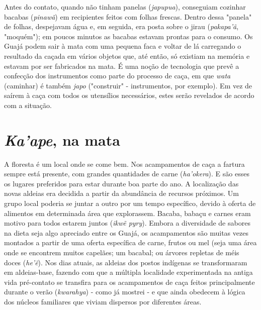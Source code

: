 Antes do contato, quando não tinham panelas (\emph{japupua}), conseguiam
cozinhar bacabas (\emph{pinawã}) em recipientes feitos com folhas
frescas. Dentro dessa "panela" de folhas, despejavam água e, em seguida,
era posta sobre o jirau (\emph{pakapa'ã}, "moquém"); em poucos minutos
as bacabas estavam prontas para o consumo. Os Guajá podem sair à mata
com uma pequena faca e voltar de lá carregando o resultado da caçada em
vários objetos que, até então, só existiam na memória e estavam por ser
fabricados na mata. É uma noção de tecnologia que prevê a confecção dos
instrumentos como parte do processo de caça, em que \emph{wata}
(caminhar) é também \emph{japo} ("construir" - instrumentos, por
exemplo). Em vez de saírem à caça com todos os utensílios necessários,
estes serão revelados de acordo com a situação.

\section{\emph{Ka'ape}, na mata}\label{kaape-na-mata}

A floresta é um local onde se come bem. Nos acampamentos de caça a
fartura sempre está presente, com grandes quantidades de carne
(\emph{ha'okera}). E são esses os lugares preferidos para estar durante
boa parte do ano. A localização das novas aldeias era decidida a partir
da abundância de recursos próximos. Um grupo local poderia se juntar a
outro por um tempo específico, devido à oferta de alimentos em
determinada área que explorassem. Bacaba, babaçu e carnes eram motivo
para todos estarem juntos (\emph{ikwẽ pyry}). Embora a diversidade de
sabores na dieta seja algo apreciado entre os Guajá, os acampamentos são
muitas vezes montados a partir de uma oferta específica de carne, frutos
ou mel (seja uma área onde se encontrem muitos capelães; um bacabal; ou
árvores repletas de méis doces (\emph{he'ẽ}). Nos dias atuais, as
aldeias dos postos indígenas se transformaram em aldeias-base, fazendo
com que a múltipla localidade experimentada na antiga vida pré-contato
se transfira para os acampamentos de caça feitos principalmente durante
o verão (\emph{kwarahya}) - como já mostrei - e que ainda obedecem à
lógica dos núcleos familiares que viviam dispersos por diferentes áreas.

